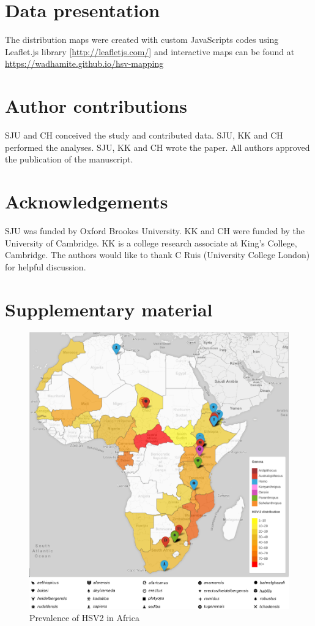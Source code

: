 \documentclass[fleqn,10pt]{wlscirep}
\begin{document}
\section*{Data presentation}
The distribution maps were created with custom JavaScripts codes using Leaflet.js library [\url{http://leafletjs.com/}] and interactive maps can be found at \url{https://wadhamite.github.io/hsv-mapping}

\section*{Author contributions}
SJU and CH conceived the study and contributed data. SJU, KK and CH performed the analyses. SJU, KK and CH wrote the paper. All authors approved the publication of the manuscript.

\section*{Acknowledgements}
SJU was funded by Oxford Brookes University. KK and CH were funded by the University of Cambridge. KK is a college research associate at King’s College, Cambridge. The authors would like to thank C Ruis (University College London) for helpful discussion. 

\printbibliography

\clearpage
\section*{Supplementary material}
\renewcommand\thefigure{A.\arabic{figure}}    
\setcounter{figure}{0} 
\renewcommand\thetable{A.\arabic{figure}}    
\setcounter{table}{0} 

\begin{figure}[!h]
	\centering
	\includegraphics[width=\textwidth]{figs/fossils}
	\caption{Prevalence of HSV2 in Africa}
	\label{fig:hsv2}   
\end{figure}  
\end{document}
